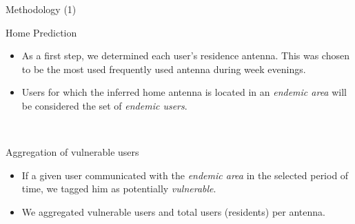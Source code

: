 \documentclass{beamer}
\begin{document}
\begin{frame}{Methodology (1)}

	\begin{block}{Home Prediction}
		\begin{itemize}
			\item As a first step, we determined each user's residence antenna. This was chosen to be the most used frequently used antenna during week evenings.



			\item Users for which the inferred home antenna is located in an \textit{endemic area} will
			be considered the set of \textit{endemic users}.

		\end{itemize}
	\end{block}
	\pause\
	\begin{block}{Aggregation of vulnerable users}
		\begin{itemize}

			\item If a given user communicated with the \textit{endemic area} in the selected period of time, we tagged him as potentially \textit{vulnerable}.


			\item  We aggregated vulnerable users and total users (residents) per antenna.


\end{itemize}
\end{block}
\end{frame}
\end{document}
